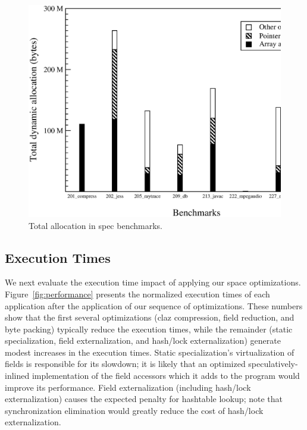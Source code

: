 \documentclass{acmconf}
\begin{document}
\begin{figure}
\includegraphics[scale=0.32,clip=true]{Figures/spec-space.eps}
\caption{Total allocation in spec benchmarks.}
\label{fig:object-array-pointer}
\end{figure}

\subsection{Execution Times} 
\label{sec:byte-pack}

We next evaluate the execution time impact of applying our space
optimizations. Figure~\ref{fig:performance} presents the normalized execution 
times of each application after the application of our sequence
of optimizations. These numbers show that the first several
optimizations (claz compression, field reduction, and byte packing)
typically reduce the execution times, while the
remainder (static specialization, field externalization, and  hash/lock
externalization) generate modest increases in the execution times. 
Static specialization's virtualization of fields is responsible for
its slowdown; it is likely that an optimized speculatively-inlined
implementation of the field accessors which it adds to the program
would improve its performance.  Field externalization (including
hash/lock externalization) causes the expected penalty for hashtable
lookup; note that synchronization elimination would greatly reduce the
cost of hash/lock externalization.
\end{document}
